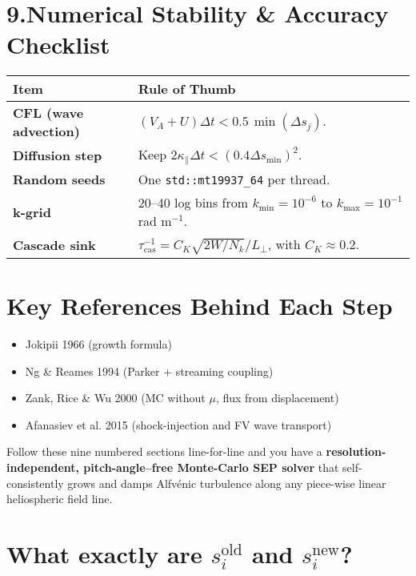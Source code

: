 \section*{9.\quad Numerical Stability \& Accuracy Checklist}

\begin{tabular}{|p{4cm}|p{10cm}|}
\hline
\textbf{Item} & \textbf{Rule of Thumb} \\
\hline
\textbf{CFL (wave advection)} & $(V_A + U) \Delta t < 0.5\,\min(\Delta s_j)$. \\
\hline
\textbf{Diffusion step} & Keep $2 \kappa_\parallel \Delta t < (0.4 \Delta s_{\min})^2$. \\
\hline
\textbf{Random seeds} & One \texttt{std::mt19937\_64} per thread. \\
\hline
\textbf{k-grid} & 20–40 log bins from $k_{\min} = 10^{-6}$ to $k_{\max} = 10^{-1}$ rad m$^{-1}$. \\
\hline
\textbf{Cascade sink} & $\tau_{\text{cas}}^{-1} = C_K \sqrt{2W/N_k} / L_\perp$, with $C_K \approx 0.2$. \\
\hline
\end{tabular}

\section*{Key References Behind Each Step}

\begin{itemize}
\item Jokipii 1966 (growth formula)
\item Ng \& Reames 1994 (Parker + streaming coupling)
\item Zank, Rice \& Wu 2000 (MC without $\mu$, flux from displacement)
\item Afanasiev et al. 2015 (shock-injection and FV wave transport)
\end{itemize}

\bigskip

Follow these nine numbered sections line-for-line and you have a \textbf{resolution-independent, pitch-angle–free Monte-Carlo SEP solver} that self-consistently grows and damps Alfvénic turbulence along any piece-wise linear heliospheric field line.


\section*{What exactly are \( s_i^{\text{old}} \) and \( s_i^{\text{new}} \)?}

